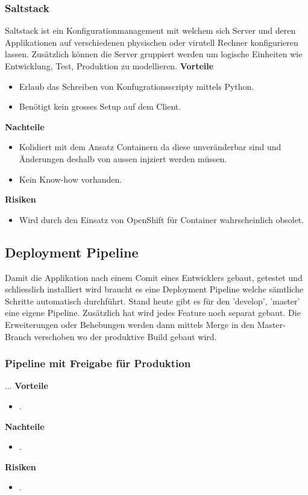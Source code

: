 \subsubsection{Saltstack}

Saltstack ist ein Konfigurationmanagement mit welchem sich Server und deren Applikationen auf verschiedenen physischen oder virutell Rechner konfigurieren lassen. Zusätzlich können die Server gruppiert werden um logische Einheiten wie Entwicklung, Test, Produktion zu modellieren.\newline
\newline
\textbf{Vorteile}
\begin{itemize}
	\item Erlaub das Schreiben von Konfugrationsscripty mittels Python.
	\item Benötigt kein grosses Setup auf dem Client.
\end{itemize}
\textbf{Nachteile}
\begin{itemize}
	\item Kolidiert mit dem Ansatz Containern da diese unveränderbar sind und Änderungen deshalb von aussen injziert werden müssen.
	\item Kein Know-how vorhanden.
\end{itemize}
\textbf{Risiken}
\begin{itemize}
	\item Wird durch den Einsatz von OpenShift für Container wahrscheinlich obsolet.
\end{itemize}

\subsection{Deployment Pipeline}

Damit die Applikation nach einem Comit eines Entwicklers gebaut, getestet und schliesslich installiert wird braucht es eine Deployment Pipeline welche sämtliche Schritte automatisch durchführt. Stand heute gibt es für den 'develop', 'master' eine eigene Pipeline. Zusätzlich hat wird jedes Feature noch separat gebaut. Die Erweiterungen oder Behebungen werden dann mittels Merge in den Master-Branch verschoben wo der produktive Build gebaut wird. 

\subsubsection{Pipeline mit Freigabe für Produktion}

...\newline
\newline
\textbf{Vorteile}
\begin{itemize}
	\item .
\end{itemize}
\textbf{Nachteile}
\begin{itemize}
	\item .
\end{itemize}
\textbf{Risiken}
\begin{itemize}
	\item .
\end{itemize}

